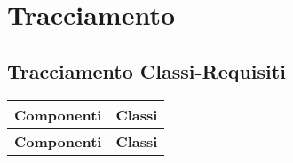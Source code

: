 \section{Tracciamento}

	\subsection{Tracciamento Classi-Requisiti}
\begin{center}
\begin{longtable}{p{13cm}!{\VRule[1pt]}p{2cm}}
\color{white} \textbf{Componenti} & \color{white} \textbf{Classi}\\ 
\endfirsthead 
{} 
\color{white} \textbf{Componenti} & \color{white} \textbf{Classi}\\  
\endhead 


\end{longtable}
\end{center}
